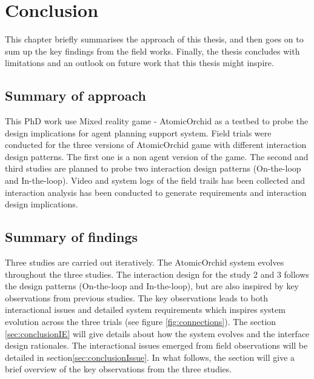 \chapter{Conclusion}

This chapter briefly summarises the approach of this thesis, and then goes on to sum up the key findings from the field works. Finally, the thesis concludes with limitations and an outlook on future work that this thesis might inspire.\\

\section{Summary of approach}
This PhD work use Mixed reality game - AtomicOrchid as a testbed to probe the design implications for agent planning support system. Field trials were conducted for the three versions of AtomicOrchid game with different interaction design patterns. The first one is a non agent version of the game. The second and third studies are planned to probe two interaction design patterns (On-the-loop and In-the-loop). Video and system logs of the field trails has been collected and interaction analysis has been conducted to generate requirements and interaction design implications. \\


\section{Summary of findings}
Three studies are carried out iteratively. The AtomicOrchid system evolves throughout the three studies. The interaction design for the study 2 and 3 follows the design patterns (On-the-loop and In-the-loop), but are also inspired by key observations from previous studies. The key observations leads to both interactional issues and detailed system requirements which inspires system evolution across the three trials (see figure \ref{fig:connections}).  The section \ref{sec:conclusionIE}  will give details about how the system evolves and the interface design rationales. The interactional issues emerged from field observations will be detailed in section\ref{sec:conclusionIssue}.  In what follows, the section will give a brief overview of the key observations from the three studies.\\ 


